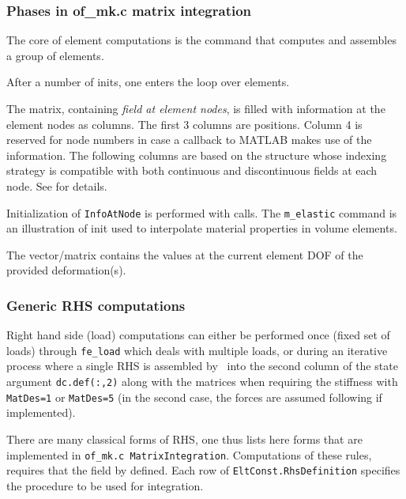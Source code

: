 \subsubsection{Phases in of\_mk.c matrix integration} 

The core of element computations is the  command that computes and assembles a group of elements.

After a number of inits, one enters the loop over elements. 

The  matrix, containing {\em field at element nodes}, is filled with information at the element nodes as columns. The first 3 columns are positions. Column 4 is reserved for node numbers in case a callback to MATLAB makes use of the information. The following columns are based on the  structure whose indexing strategy is compatible with both continuous and discontinuous fields at each node. See  for details.

Initialization of {\tt InfoAtNode} is performed with  calls. The {\tt m\_elastic}  command is an illustration of init used to interpolate material properties in volume elements.

The  vector/matrix contains the values at the current element DOF of the provided deformation(s).

\subsubsection{Generic RHS computations\label{rhs_og}} 

Right hand side (load) computations can either be performed once (fixed set of loads) through {\tt fe\_load} which deals with multiple loads, or during an iterative process where a single RHS is assembled by \femknl\ into the second column of the state argument  {\tt dc.def(:,2)} along with the matrices when requiring the stiffness with {\tt MatDes=1} or {\tt MatDes=5} (in the second case, the forces are assumed following if implemented).


 There are many classical forms of RHS, one thus lists here forms that are implemented in {\tt of\_mk.c MatrixIntegration}. Computations of these rules, requires that the  field by defined. Each row of {\tt EltConst.RhsDefinition} specifies the procedure to be used for integration. 

